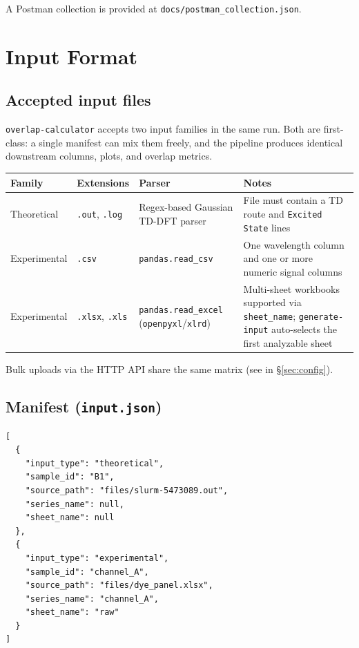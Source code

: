 \documentclass[11pt,a4paper]{article}
\newcommand{\idtt}[1]{\texttt{\seqsplit{#1}}}
\begin{document}
A Postman collection is provided at
\texttt{docs/postman\_collection.json}.

\section{Input Format}
\label{sec:input}

\subsection{Accepted input files}

\texttt{overlap-calculator} accepts two input families in the same run.
Both are first-class: a single manifest can mix them freely, and the
pipeline produces identical downstream columns, plots, and overlap
metrics.

\begin{longtable}{@{}>{\RaggedRight}p{2.6cm}>{\RaggedRight}p{2.8cm}>{\RaggedRight}p{4.2cm}>{\RaggedRight}p{4.7cm}@{}}
\toprule
\textbf{Family} & \textbf{Extensions} & \textbf{Parser} & \textbf{Notes} \\
\midrule
\endhead
Theoretical  & \texttt{.out}, \texttt{.log}           & Regex-based Gaussian TD-DFT parser                     & File must contain a TD route and \texttt{Excited State} lines \\
Experimental & \texttt{.csv}                          & \texttt{pandas.read\_csv}                              & One wavelength column and one or more numeric signal columns \\
Experimental & \texttt{.xlsx}, \texttt{.xls}          & \texttt{pandas.read\_excel} (\texttt{openpyxl}/\texttt{xlrd}) & Multi-sheet workbooks supported via \texttt{sheet\_name}; \texttt{generate-input} auto-selects the first analyzable sheet \\
\bottomrule
\end{longtable}

\noindent Bulk uploads via the HTTP API share the same matrix (see
\idtt{GAUSS\_UPLOAD\_ALLOWED\_EXTS} in \S\ref{sec:config}).

\subsection{Manifest (\texttt{input.json})}

\begin{lstlisting}[language=jsonish]
[
  {
    "input_type": "theoretical",
    "sample_id": "B1",
    "source_path": "files/slurm-5473089.out",
    "series_name": null,
    "sheet_name": null
  },
  {
    "input_type": "experimental",
    "sample_id": "channel_A",
    "source_path": "files/dye_panel.xlsx",
    "series_name": "channel_A",
    "sheet_name": "raw"
  }
]
\end{lstlisting}
\end{document}
